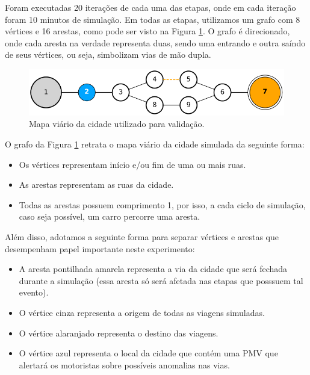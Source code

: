 Foram executadas 20 iterações de cada uma das etapas, onde em cada iteração foram 10 minutos de simulação.
Em todas as etapas, utilizamos um grafo com 8 vértices e 16 arestas, como pode ser visto na Figura \ref{fig:mapa_validacao}.
O grafo é direcionado, onde cada aresta na verdade representa duas, sendo uma entrando e outra saíndo de seus vértices, ou seja, simbolizam vias de mão dupla.

\begin{figure}[ht]
	\centering
	\includegraphics[width=\textwidth]{figuras/mapa_validacao.png}
	\caption{Mapa viário da cidade utilizado para validação.}
	\label{fig:mapa_validacao}
\end{figure}

O grafo da Figura \ref{fig:mapa_validacao} retrata o mapa viário da cidade simulada da seguinte forma:

\begin{itemize}
    \item Os vértices representam início e/ou fim de uma ou mais ruas.

    \item As arestas representam as ruas da cidade.

    \item Todas as arestas possuem comprimento 1, por isso, a cada ciclo de simulação, caso seja possível, um carro percorre uma aresta.
\end{itemize}

Além disso, adotamos a seguinte forma para separar vértices e arestas que desempenham papel importante neste experimento:

\begin{itemize}
    \item A aresta pontilhada amarela representa a via da cidade que será fechada durante a simulação (essa aresta só será afetada nas etapas que posssuem tal evento).

    \item O vértice cinza representa a origem de todas as viagens simuladas.

    \item O vértice alaranjado representa o destino das viagens.

    \item O vértice azul representa o local da cidade que contém uma PMV que alertará os motoristas sobre possíveis anomalias nas vias.
\end{itemize}


